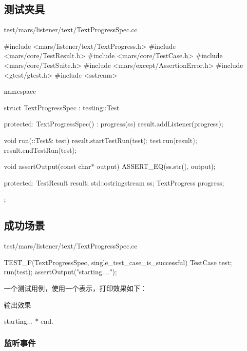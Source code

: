 \begin{content}

\subsection{测试夹具}

\begin{nodiff}{test/mars/listener/text/TextProgressSpec.cc}
 \begin{c++}
#include <mars/listener/text/TextProgress.h>
#include <mars/core/TestResult.h>
#include <mars/core/TestCase.h>
#include <mars/core/TestSuite.h>
#include <mars/except/AssertionError.h>
#include <gtest/gtest.h>
#include <sstream>

namespace {
  struct TextProgressSpec : testing::Test {
  protected:
    TextProgressSpec() : progress(ss) {
      result.addListener(progress);
    }

    void run(::Test& test) {
      result.startTestRun(test);
      test.run(result);
      result.endTestRun(test);
    }

    void assertOutput(const char* output) {
      ASSERT_EQ(ss.str(), output);
    }

  protected:
    TestResult result;
    std::ostringstream ss;
    TextProgress progress;
  };
}
 \end{c++}
\end{nodiff}

\subsection{成功场景}

\begin{nodiff}{test/mars/listener/text/TextProgressSpec.cc}
 \begin{c++}
TEST_F(TextProgressSpec, single_test_case_is_successful) {
  TestCase test;
  run(test);
  assertOutput("starting...\n*\nend.\n");
}
 \end{c++}
\end{nodiff}

一个测试用例，使用一个\ascii{*}表示，打印效果如下：

\begin{nodiff}{输出效果}
 \begin{c++}
starting...
*
end.
 \end{c++}
\end{nodiff}

\subsubsection{监听事件}


\end{content}
